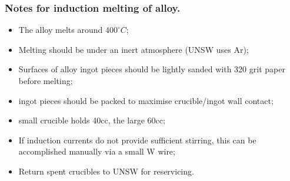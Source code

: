 \subsubsection{Notes for induction melting of \MgZnCa alloy.}
\begin{itemize}
\item The \MgZnCa alloy melts around $400^{\circ}C$;
\item Melting should be under an inert atmosphere (UNSW uses Ar);
\item Surfaces of alloy ingot pieces should be lightly sanded with 320 grit paper before melting;
\item ingot pieces should be packed to maximise crucible/ingot wall contact;
\item small crucible holds 40cc, the large 60cc;
\item If induction currents do not provide sufficient stirring, this can be accomplished manually via a small W wire; 
\item Return spent crucibles to UNSW for reservicing. 
\end{itemize}